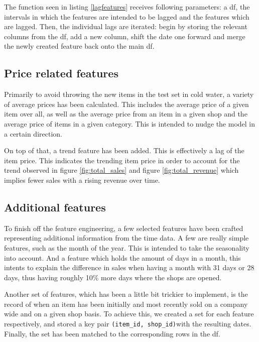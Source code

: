 

The function seen in listing \ref{lagfeatures} receives following parameters: a \gls{df}, the intervals in which the features are intended to be lagged and the features which are lagged. Then, the individual lags are iterated: begin by storing the relevant columns from the \gls{df}, add a new column, shift the date one forward and merge the newly created feature back onto the main \gls{df}.


\subsection{Price related features}

Primarily to avoid throwing the new items in the test set in cold water, a variety of average prices has been calculated. This includes the average price of a given item over all, as well as the average price from an item in a given shop and the average price of items in a given category.
This is intended to nudge the model in a certain direction.

On top of that, a trend feature has been added. This is effectively a lag of the item price. This indicates the trending item price in order to account for the trend observed in figure \ref{fig:total_sales} and figure \ref{fig:total_revenue} which implies fewer sales with a rising revenue over time.

\subsection{Additional features}

To finish off the feature engineering, a few selected features have been crafted representing additional information from the time data. A few are really simple features, such as the month of the year. This is intended to take the seasonality into account. And a feature which holds the amount of days in a month, this intents to explain the difference in sales when having a month with 31 days or 28 days, thus having roughly 10\% more days where the shops are opened.

Another set of features, which has been a little bit trickier to implement, is the record of when an item has been initially and most recently sold on a company wide and on a given shop basis.
To achieve this, we created a set for each feature respectively, and stored a key pair \texttt{(item\_id, shop\_id)}with the resulting dates. Finally, the set has been matched to the corresponding rows in the \gls{df}.
